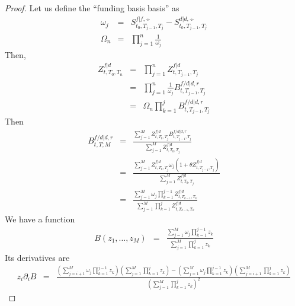 \documentclass[11pt,english]{amsart}
\theoremstyle{definition}
\begin{document}
\begin{proof}
Let us define the ``funding basis basis'' as 
\begin{eqnarray}
	\omega_j  &=& S^{f|f,\div}_{t_0,T_{j-1},T_j}  -  S^{d|d,\div}_{t_0,T_{j-1},T_j} \\
	\Omega_n &=& \prod_{j=1}^n \frac{1}{\omega_j}
\end{eqnarray}
Then, 
\begin{eqnarray*}
	Z^{f|d}_{t,T_0,T_n} 
	&=& \prod_{j=1}^n Z^{f|d}_{t,T_{j-1},T_j}  \\
	&=& \prod_{j=1}^n \frac{1}{\omega_j} B^{f/d|d,r}_{t,T_{j-1},T_j}  \\
	&=& \Omega_n \prod_{k=1}^j B^{f/d|d,r}_{t,T_{j-1},T_j}  
\end{eqnarray*}
Then 
\begin{eqnarray*}
	B^{f/d|d,r}_{t,T;M}  
	&=& \frac{ \sum_{j=1}^{M}   Z^{f|d}_{t,T_0,T_j} B^{f/d|d,r}_{t,T_{j-1},T_j} }{\sum_{j=1}^{M}  Z^{f|d}_{t,T_0,T_j}} \\
	&=& \frac{ \sum_{j=1}^{M}   Z^{f|d}_{t,T_0,T_j} \omega_j \left(1+\theta Z^{f|d}_{t,T_{j-1},T_j}\right) }{\sum_{j=1}^{M}  Z^{f|d}_{t,T_0,T_j}} \\
	&=& \frac{ \sum_{j=1}^{M} \omega_j \prod_{k=1}^{j-1} Z^{f|d}_{t,T_{k-1},T_{k}} } {  \sum_{j=1}^{M}  \prod_{k=1}^{j} Z^{f|d}_{t,T_{k-1},T_{k}}  }
\end{eqnarray*}
We have a function 
\begin{eqnarray*}
	B(z_1,\ldots,z_M) &=& \frac{ \sum_{j=1}^{M} \omega_j \prod_{k=1}^{j-1} z_k  } {  \sum_{j=1}^{M}  \prod_{k=1}^{j} z_k }
\end{eqnarray*}
Its derivatives are 
\begin{eqnarray}
	z_i\partial_i B &=& \frac{ \left( \sum_{j=i+1}^{M} \omega_j \prod_{k=1}^{j-1} z_k \right)  \left( \sum_{j=1}^{M}  \prod_{k=1}^{j} z_k \right) 
	- \left( \sum_{j=1}^{M} \omega_j \prod_{k=1}^{j-1} z_k \right)  \left( \sum_{j=i+1}^{M}  \prod_{k=1}^{j} z_k \right) }
	{  \left( \sum_{j=1}^{M}  \prod_{k=1}^{j} z_k \right)^2 }   
\end{eqnarray} 
\end{proof}
\end{document}
